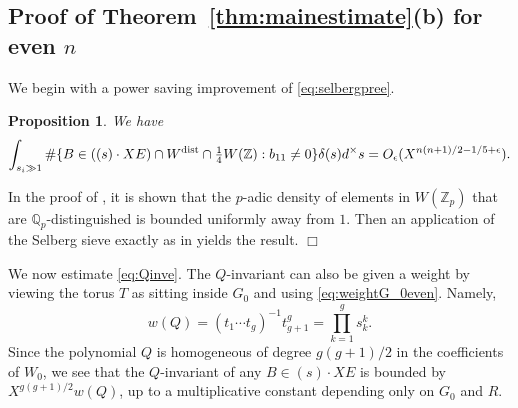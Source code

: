 \documentclass[11pt]{article}
\def\Z{{\mathbb Z}}
\def\dist{{\rm dist}}
\def\Q{{\mathbb Q}}
\def\Z{{\mathbb Z}}
\def\Q{{\mathbb Q}}
\newtheorem{proposition}[theorem]{Proposition}
\newenvironment{proof}{\noindent {\bf Proof:}}{$\Box$ \vspace{2 ex}}
\begin{document}
\subsection{Proof of Theorem~\ref{thm:mainestimate}(b) for even $n$}\label{sgomeven}

We begin with a power saving improvement of \eqref{eq:selbergpree}.

\begin{proposition}\label{propeven}
  We have
  \begin{equation*}
\displaystyle\int_{s_i\gg 1} \#\{B\in ((s)\cdot XE)\cap W^\dist \cap {\textstyle\frac14} W(\Z): b_{11}\neq 0\}\delta(s)d^\times s =O_\epsilon(X^{n(n+1)/2-1/5+\epsilon}).
  \end{equation*}
\end{proposition}
\begin{proof}
In the proof of \cite[Proposition 23]{SW}, it is shown that the
$p$-adic density of elements in $W(\Z_p)$ that are
$\Q_p$-distinguished is bounded uniformly away from $1$.  Then an
application of the Selberg sieve exactly as in \cite{ShTs} yields the
result.
\end{proof}

We now estimate \eqref{eq:Qinve}. The $Q$-invariant can also be given
a weight by viewing the torus $T$ as sitting inside $G_0$ and using
\eqref{eq:weightG_0even}. Namely,
\begin{equation}\label{eqQweighteven}
w(Q)=(t_1\cdots t_g)^{-1}t_{g+1}^g=\prod_{k=1}^g s_k^k.
\end{equation}
Since the polynomial $Q$ is homogeneous of degree $g(g+1)/2$ in the
coefficients of $W_0$, we see that the $Q$-invariant of any $B\in
(s)\cdot XE$ is bounded by $X^{g(g+1)/2}w(Q)$, up to a multiplicative
constant depending only on $G_0$ and $R$.
\end{document}
